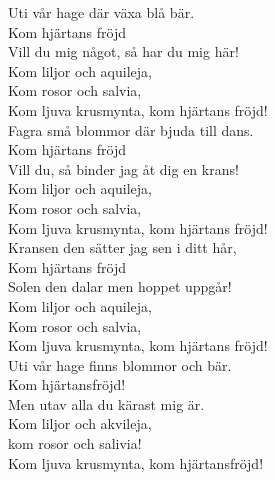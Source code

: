 \documentclass[a6paper,10pt]{article}
\begin{document}
\setlength{\oddsidemargin}{-0.37in}
\noindent
\begin{center}
\end{center}
\begin{lyrics}
Uti vår hage där växa blå bär.\\
Kom hjärtans fröjd\\
Vill du mig något, så har du mig här!\\
Kom liljor och aquileja,\\
Kom rosor och salvia,\\
Kom ljuva krusmynta, kom hjärtans fröjd!
\vspace{5pt}\\
Fagra små blommor där bjuda till dans.\\
Kom hjärtans fröjd\\
Vill du, så binder jag åt dig en krans!\\
Kom liljor och aquileja,\\
Kom rosor och salvia,\\
Kom ljuva krusmynta, kom hjärtans fröjd!
\vspace{5pt}\\
Kransen den sätter jag sen i ditt hår,\\
Kom hjärtans fröjd\\
Solen den dalar men hoppet uppgår!\\
Kom liljor och aquileja,\\
Kom rosor och salvia,\\
Kom ljuva krusmynta, kom hjärtans fröjd!
\vspace{5pt}\\
Uti vår hage finns blommor och bär. \\
Kom hjärtansfröjd! \\
Men utav alla du kärast mig är. \\
Kom liljor och akvileja,\\
kom rosor och salivia! \\
Kom ljuva krusmynta, kom hjärtansfröjd!
\end{lyrics}
\end{document}
